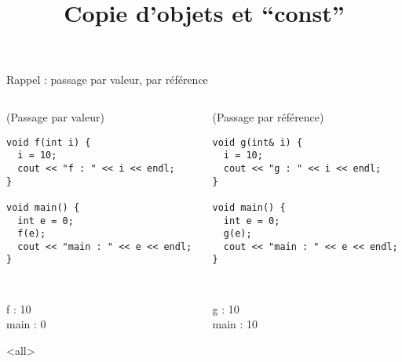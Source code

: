 \documentclass[c]{beamer}
\title{Copie d'objets et ``const''}
\begin{document}
\maketitle
{}

\begin{frame}[fragile]{Rappel : passage par valeur, par référence}
 \begin{columns}
\begin{column}{0.5\columnwidth}
\begin{cbox}[][lwuc][\footnotesize](Passage par valeur)
\begin{verbatim}
void f(int i) {
  i = 10;
  cout << "f : " << i << endl;
}

void main() {
  int e = 0;
  f(e);
  cout << "main : " << e << endl;
}
\end{verbatim}

\tt
\begin{cbox}
f : 10\\
main : 0
\end{cbox}

\onslide<all>
\end{cbox}
\end{column}
\begin{column}{0.5\columnwidth}
\begin{cbox}[][lwuc][\footnotesize](Passage par référence)
\begin{verbatim}
void g(int& i) {
  i = 10;
  cout << "g : " << i << endl;
}

void main() {
  int e = 0;
  g(e);
  cout << "main : " << e << endl;
}
\end{verbatim}

\tt
\begin{cbox}
g : 10\\
main : 10
\end{cbox}
\end{cbox}
\end{column}
\end{columns}
\end{frame}

\end{document}
